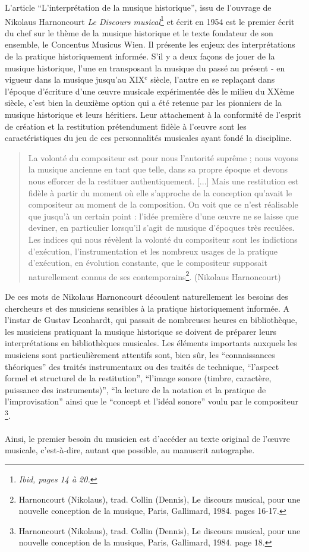 L'article \enquote{L'interprétation de la musique historique}, issu de l'ouvrage de Nikolaus Harnoncourt \textit{Le Discours musical}\footnote{\textit{Ibid, pages 14 à 20.}} et écrit en 1954 est le premier écrit du chef sur le thème de la musique historique et le texte fondateur de son ensemble, le Concentus Musicus Wien. Il présente les enjeux des interprétations de la pratique historiquement informée. 
S'il y a deux façons de jouer de la musique historique, l'une en transposant la musique du passé au présent - en vigueur dans la musique jusqu'au XIX$^{e}$ siècle, l'autre en se replaçant dans l'époque d'écriture d'une œuvre musicale expérimentée dès le milieu du XXème siècle, c'est bien la deuxième option qui a été retenue par les pionniers de la musique historique et leurs héritiers. Leur attachement à la conformité de l'esprit de création et la restitution prétendument fidèle à l'œuvre sont les caractéristiques du jeu de ces personnalités musicales ayant fondé la discipline. 

\begin{quote}
	La volonté du compositeur est pour nous l'autorité suprême ; nous voyons la musique ancienne en tant que telle, dans sa propre époque et devons nous efforcer de la restituer authentiquement. [...] Mais une restitution est fidèle à partir du moment où elle s'approche de la conception qu'avait le compositeur au moment de la composition. On voit que ce n'est réalisable que jusqu'à un certain point : l'idée première d'une œuvre ne se laisse que deviner, en particulier lorsqu'il s'agit de musique d'époques très reculées. Les indices qui nous révèlent la volonté du compositeur sont les indictions d'exécution, l'instrumentation et les nombreux usages de la pratique d'exécution, en évolution constante, que le compositeur supposait naturellement connus de ses contemporains\footnote{Harnoncourt (Nikolaus), trad. Collin (Dennis), Le discours musical, pour une nouvelle conception de la musique, Paris, Gallimard, 1984. pages 16-17.}. (Nikolaus Harnoncourt)
\end{quote}

De ces mots de Nikolaus Harnoncourt découlent naturellement les besoins des chercheurs et des musiciens sensibles à la pratique historiquement informée. A l'instar de Gustav Leonhardt, qui passait de nombreuses heures en bibliothèque, les musiciens pratiquant la musique historique se doivent de préparer leurs interprétations en bibliothèques musicales. Les éléments importants auxquels les musiciens sont particulièrement attentifs sont, bien sûr, les \enquote{connaissances théoriques} des traités instrumentaux ou des traités de technique, \enquote{l'aspect formel et structurel de la restitution}, \enquote{l'image sonore (timbre, caractère, puissance des instruments)}, \enquote{la lecture de la notation et la pratique de l'improvisation} ainsi que le \enquote{concept et l'idéal sonore} voulu par le compositeur \footnote{Harnoncourt (Nikolaus), trad. Collin (Dennis), Le discours musical, pour une nouvelle conception de la musique, Paris, Gallimard, 1984. page 18.}.
\\\\
Ainsi, le premier besoin du musicien est d'accéder au texte original de l'œuvre musicale, c'est-à-dire, autant que possible, au manuscrit autographe.

